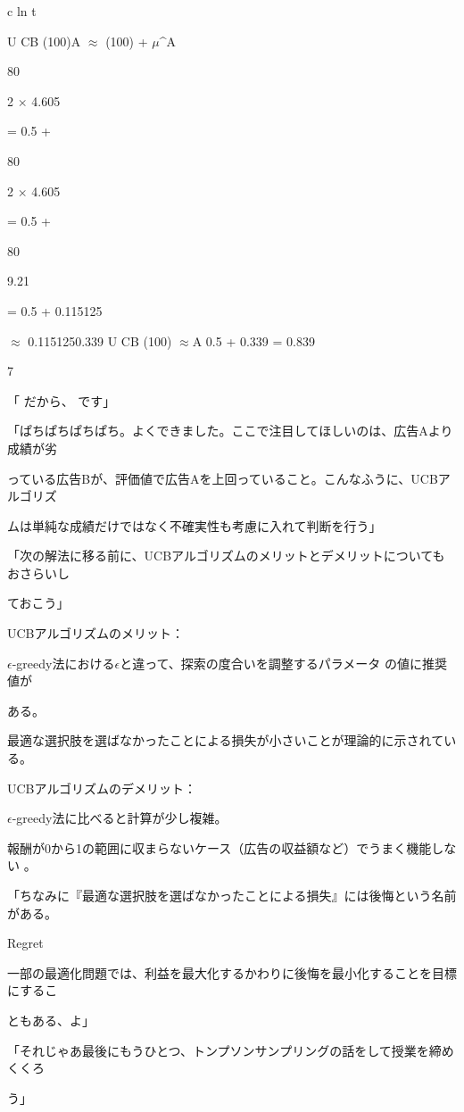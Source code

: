 c ln t\par
U CB  (100)A $\approx$   (100) +  $\mu$\textasciicircum{}A\par
80\par
2 $\times$ 4.605\par
= 0.5 +\par
80\par
2 $\times$ 4.605\par
= 0.5 +\par
80\par
9.21\par
= 0.5 +  0.115125\par
$\approx$ 0.1151250.339 U CB  (100) $\approx$A 0.5 + 0.339 = 0.839\par
7\par

「 だから、 です」\par
「ぱちぱちぱちぱち。よくできました。ここで注⽬してほしいのは、広告Aより成績が劣\par
っている広告Bが、評価値で広告Aを上回っていること。こんなふうに、UCBアルゴリズ\par
ムは単純な成績だけではなく不確実性も考慮に⼊れて判断を⾏う」\par
「次の解法に移る前に、UCBアルゴリズムのメリットとデメリットについてもおさらいし\par
ておこう」\par
UCBアルゴリズムのメリット：\par
$\epsilon$-greedy法における$\epsilon$と違って、探索の度合いを調整するパラメータ の値に推奨値が\par
ある。\par
最適な選択肢を選ばなかったことによる損失が⼩さいことが理論的に⽰されている。\par
UCBアルゴリズムのデメリット：\par
$\epsilon$-greedy法に⽐べると計算が少し複雑。\par
報酬が0から1の範囲に収まらないケース（広告の収益額など）でうまく機能しない 。\par
「ちなみに『最適な選択肢を選ばなかったことによる損失』には後悔という名前がある。\par
Regret\par
⼀部の最適化問題では、利益を最⼤化するかわりに後悔を最⼩化することを⽬標にするこ\par
ともある、よ」\par
「それじゃあ最後にもうひとつ、トンプソンサンプリングの話をして授業を締めくくろ\par
う」\par
